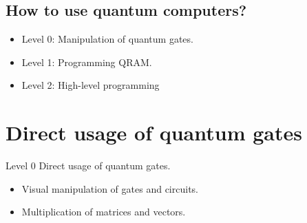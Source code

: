 \documentclass{beamer}
\begin{document}
\subsection{How to use quantum computers?}


\begin{frame}{\insertsection}{\insertsubsection}

  \begin{itemize}
    \item<1-> Level 0: Manipulation of quantum gates.
    \item<2-> Level 1: Programming QRAM.
    \item<3-> Level 2: High-level programming 
  \end{itemize}
\end{frame}

\section{Direct usage of quantum gates}

\begin{frame}{\insertsection}{\insertsubsection}
\begin{block}{Level 0}
    Direct usage of quantum gates.
\end{block}
\begin{itemize}
    \item Visual manipulation of gates and circuits.
    \item Multiplication of matrices and vectors.
\end{itemize}
\end{frame}
\end{document}
